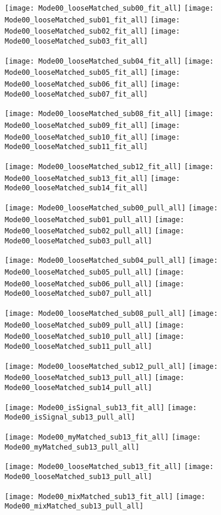 \documentclass{article}
\begin{document}
\texttt{[image: Mode00\_looseMatched\_sub00\_fit\_all]}
\texttt{[image: Mode00\_looseMatched\_sub01\_fit\_all]}
\texttt{[image: Mode00\_looseMatched\_sub02\_fit\_all]}
\texttt{[image: Mode00\_looseMatched\_sub03\_fit\_all]}


\texttt{[image: Mode00\_looseMatched\_sub04\_fit\_all]}
\texttt{[image: Mode00\_looseMatched\_sub05\_fit\_all]}
\texttt{[image: Mode00\_looseMatched\_sub06\_fit\_all]}
\texttt{[image: Mode00\_looseMatched\_sub07\_fit\_all]}


\texttt{[image: Mode00\_looseMatched\_sub08\_fit\_all]}
\texttt{[image: Mode00\_looseMatched\_sub09\_fit\_all]}
\texttt{[image: Mode00\_looseMatched\_sub10\_fit\_all]}
\texttt{[image: Mode00\_looseMatched\_sub11\_fit\_all]}


\texttt{[image: Mode00\_looseMatched\_sub12\_fit\_all]}
\texttt{[image: Mode00\_looseMatched\_sub13\_fit\_all]}
\texttt{[image: Mode00\_looseMatched\_sub14\_fit\_all]}

\newpage

\texttt{[image: Mode00\_looseMatched\_sub00\_pull\_all]}
\texttt{[image: Mode00\_looseMatched\_sub01\_pull\_all]}
\texttt{[image: Mode00\_looseMatched\_sub02\_pull\_all]}
\texttt{[image: Mode00\_looseMatched\_sub03\_pull\_all]}


\texttt{[image: Mode00\_looseMatched\_sub04\_pull\_all]}
\texttt{[image: Mode00\_looseMatched\_sub05\_pull\_all]}
\texttt{[image: Mode00\_looseMatched\_sub06\_pull\_all]}
\texttt{[image: Mode00\_looseMatched\_sub07\_pull\_all]}


\texttt{[image: Mode00\_looseMatched\_sub08\_pull\_all]}
\texttt{[image: Mode00\_looseMatched\_sub09\_pull\_all]}
\texttt{[image: Mode00\_looseMatched\_sub10\_pull\_all]}
\texttt{[image: Mode00\_looseMatched\_sub11\_pull\_all]}


\texttt{[image: Mode00\_looseMatched\_sub12\_pull\_all]}
\texttt{[image: Mode00\_looseMatched\_sub13\_pull\_all]}
\texttt{[image: Mode00\_looseMatched\_sub14\_pull\_all]}

\newpage

\texttt{[image: Mode00\_isSignal\_sub13\_fit\_all]}
\texttt{[image: Mode00\_isSignal\_sub13\_pull\_all]}


\texttt{[image: Mode00\_myMatched\_sub13\_fit\_all]}
\texttt{[image: Mode00\_myMatched\_sub13\_pull\_all]}


\texttt{[image: Mode00\_looseMatched\_sub13\_fit\_all]}
\texttt{[image: Mode00\_looseMatched\_sub13\_pull\_all]}


\texttt{[image: Mode00\_mixMatched\_sub13\_fit\_all]}
\texttt{[image: Mode00\_mixMatched\_sub13\_pull\_all]}
\end{document}
